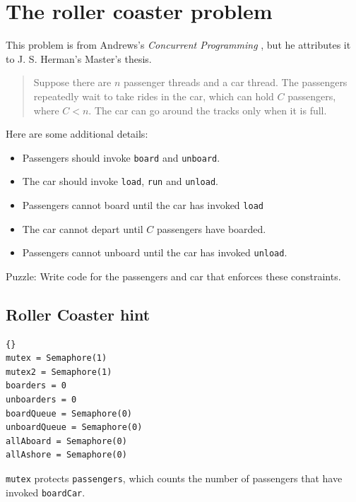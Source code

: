 \documentclass{book}
\newcommand{\clearemptydoublepage}{\newpage\cleardoublepage}
\begin{document}
\clearemptydoublepage
\section{The roller coaster problem}

This problem is from Andrews's {\em Concurrent
Programming} \cite{andrews}, but he attributes it to J. S. Herman's
Master's thesis.

\begin {quotation}
Suppose there are $n$ passenger threads and a car thread.  The passengers
repeatedly wait to take rides in the car, which can hold $C$ passengers,
where $C<n$.  The car can go around the tracks only when it is full.
\end{quotation}

Here are some additional details:

\begin{itemize}

\item Passengers should invoke {\tt board} and {\tt unboard}.

\item The car should invoke {\tt load}, {\tt run} and {\tt unload}.

\item Passengers cannot board until the car has invoked {\tt load}

\item The car cannot depart until $C$ passengers have boarded.

\item Passengers cannot unboard until the car
has invoked {\tt unload}.

\end{itemize}

Puzzle: Write code for the passengers and car that enforces these
constraints.


\clearemptydoublepage
\subsection{Roller Coaster hint}

\begin{lstlisting}[title={Roller Coaster hint}]{}
mutex = Semaphore(1)
mutex2 = Semaphore(1)
boarders = 0
unboarders = 0
boardQueue = Semaphore(0)
unboardQueue = Semaphore(0)
allAboard = Semaphore(0)
allAshore = Semaphore(0)
\end{lstlisting}

{\tt mutex} protects {\tt passengers}, which counts the number of
passengers that have invoked {\tt boardCar}.  
\end{document}
